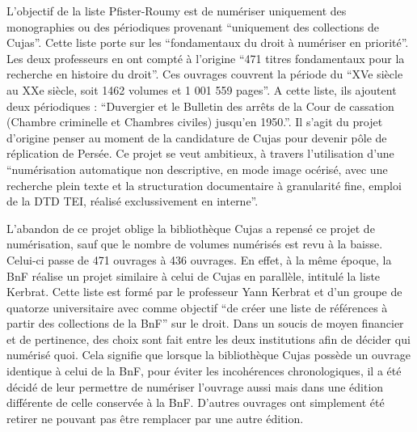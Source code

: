 L'objectif de la liste Pfister-Roumy est de numériser uniquement des monographies ou des périodiques provenant \enquote{uniquement des collections de Cujas}. Cette liste porte sur les \enquote{fondamentaux du droit à numériser en priorité}. Les deux professeurs en ont compté à l'origine \enquote{471 titres fondamentaux pour la recherche en histoire du droit}. Ces ouvrages couvrent la période du \enquote{XVe siècle au XXe siècle, soit 1462 volumes et 1 001 559 pages}. A cette liste, ils ajoutent deux périodiques : \enquote{Duvergier et le Bulletin des arrêts de la Cour de cassation (Chambre criminelle et Chambres civiles) jusqu'en 1950.}. Il s'agit du projet d'origine penser au moment de la candidature de Cujas pour devenir pôle de réplication de Persée. Ce projet se veut ambitieux, à travers l'utilisation d'une \enquote{numérisation automatique non descriptive, en mode image océrisé, avec une recherche plein texte et la structuration documentaire à granularité fine, emploi de la DTD TEI, réalisé exclussivement en interne}. 

L'abandon de ce projet oblige la bibliothèque Cujas a repensé ce projet de numérisation, sauf que le nombre de volumes numérisés est revu à la baisse. Celui-ci passe de 471 ouvrages à 436 ouvrages. En effet, à la même époque, la BnF réalise un projet similaire à celui de Cujas en parallèle, intitulé la liste Kerbrat. Cette liste est formé par le professeur Yann Kerbrat et d'un groupe de quatorze universitaire avec comme objectif \enquote{de créer une liste de références à partir des collections de la BnF} sur le droit. Dans un soucis de moyen financier et de pertinence, des choix sont fait entre les deux institutions afin de décider qui numérisé quoi. Cela signifie que lorsque la bibliothèque Cujas possède un ouvrage identique à celui de la BnF, pour éviter les incohérences chronologiques, il a été décidé de leur permettre de numériser l'ouvrage aussi mais dans une édition différente de celle conservée à la BnF. D'autres ouvrages ont simplement été retirer ne pouvant pas être remplacer par une autre édition. 


